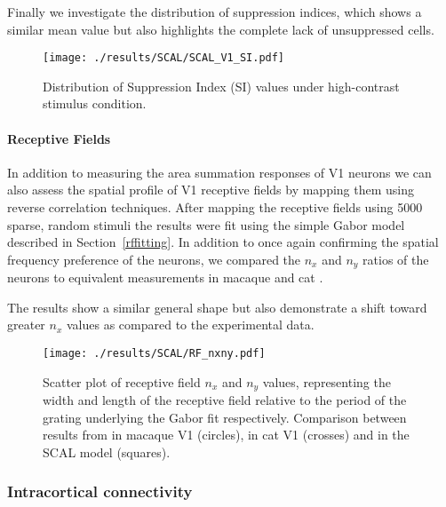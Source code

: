 Finally we investigate the distribution of suppression indices, which
shows a similar mean value but also highlights the complete lack of
unsuppressed cells.

\begin{figure}
	\centering
        \texttt{[image: ./results/SCAL/SCAL\_V1\_SI.pdf]}
	\caption{Distribution of Suppression Index (SI) values under
      high-contrast stimulus condition.}
	\label{SCALSI}
\end{figure}


\paragraph{Receptive Fields}

In addition to measuring the area summation responses of V1 neurons we
can also assess the spatial profile of V1 receptive fields by mapping
them using reverse correlation techniques. After mapping the receptive
fields using 5000 sparse, random stimuli the results were fit using
the simple Gabor model described in Section~\ref{rffitting}. In
addition to once again confirming the spatial frequency preference of
the neurons, we compared the $n_x$ and $n_y$ ratios of the neurons to
equivalent measurements in macaque \citep{Ringach2002b} and cat
\citep{Jones1987}.

The results show a similar general shape but also demonstrate a shift
toward greater $n_x$ values as compared to the experimental data.

\begin{figure}
	\centering
        \texttt{[image: ./results/SCAL/RF\_nxny.pdf]}
	\caption[Relative elongation and width of V1 receptive fields. A
      comparison between SCAL, cat V1 \cite{Jones1987} and macaque V1
      \cite{Ringach2002b}.]{Scatter plot of receptive field $n_x$ and
      $n_y$ values, representing the width and length of the receptive
      field relative to the period of the grating underlying the Gabor
      fit respectively. Comparison between results from
      \cite{Ringach2002b} in macaque V1 (circles), \cite{Jones1987} in
      cat V1 (crosses) and in the SCAL model (squares).}
	\label{RFFits}
\end{figure}

\subsubsection{Intracortical connectivity}


